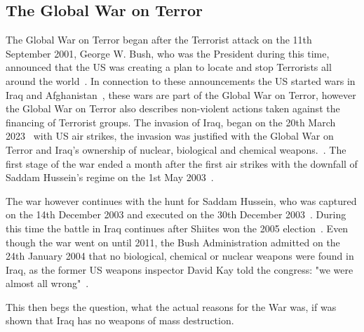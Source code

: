 \subsection{The Global War on Terror}
The Global War on Terror began after the Terrorist attack on the 11th September 2001, George W. Bush, who was the President during this time, announced that the US was creating a plan to locate and stop Terrorists all around the world~\autocite{gowt-bushlibrary}. In connection to these announcements the US started wars in Iraq and Afghanistan~\autocite{gowt-bushlibrary}, these wars are part of the Global War on Terror, however the Global War on Terror also describes non-violent actions taken against the financing of Terrorist groups.
The invasion of Iraq, began on the 20th March 2023~\autocite{cfr-iraq-war} with US air strikes, the invasion was justified with the Global War on Terror and Iraq's ownership of nuclear, biological and chemical weapons.~\autocite{britannica-iraq-war}. The first stage of the war ended a month after the first air strikes with the downfall of Saddam Hussein's regime on the 1st May 2003~\autocite{cfr-iraq-war}. 

The war however continues with the hunt for Saddam Hussein, who was captured on the 14th December 2003 and executed on the 30th December 2003~\autocite{cfr-iraq-war}. During this time the battle in Iraq continues after Shiites won the 2005 election~\autocite{cfr-iraq-war}.
Even though the war went on until 2011, the Bush Administration admitted on the 24th January 2004 that no biological, chemical or nuclear weapons were found in Iraq, as the former US weapons inspector David Kay told the congress: "we were almost all wrong"~\autocite{cnn-david-kay-senate-hearing}.

This then begs the question, what the actual reasons for the War was, if was shown that Iraq has no weapons of mass destruction.